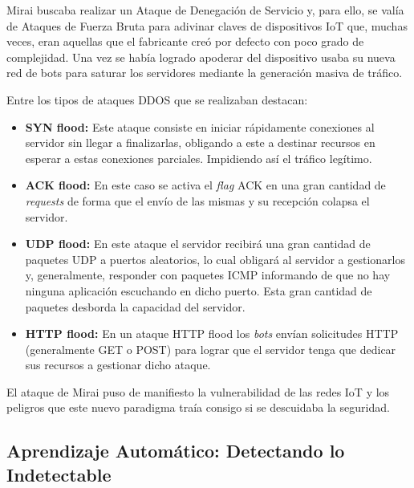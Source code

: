  
 Mirai buscaba realizar un Ataque de Denegación de Servicio y, para ello, se valía de Ataques de Fuerza Bruta para adivinar claves de dispositivos IoT que, muchas veces, eran aquellas que el fabricante creó por defecto con poco grado de complejidad. Una vez se había logrado apoderar del dispositivo usaba su nueva red de bots para saturar los servidores mediante la generación masiva de tráfico. 
 
 
 Entre los tipos de ataques DDOS que se realizaban destacan:
 \begin{itemize}
 	\item \textbf{SYN flood:} Este ataque consiste en iniciar rápidamente conexiones al servidor sin llegar a finalizarlas, obligando a este a destinar recursos en esperar a estas conexiones parciales. Impidiendo así el tráfico legítimo.
 	\item \textbf{ACK flood:} En este caso se activa el \textit{flag} ACK en una gran cantidad de \textit{requests} de forma que el envío de las mismas y su recepción colapsa el servidor.
 	\item \textbf{UDP flood:} En este ataque el servidor recibirá una gran cantidad de paquetes UDP a puertos aleatorios, lo cual obligará al servidor a gestionarlos y, generalmente, responder con paquetes ICMP informando de que no hay ninguna aplicación escuchando en dicho puerto. Esta gran cantidad de paquetes desborda la capacidad del servidor.
 	\item \textbf{HTTP flood:} En un ataque HTTP flood los \textit{bots} envían solicitudes HTTP (generalmente GET o POST) para lograr que el servidor tenga que dedicar sus recursos a gestionar dicho ataque.
\end{itemize}
El ataque de Mirai puso de manifiesto la vulnerabilidad de las redes IoT y los peligros que este nuevo paradigma traía consigo si se descuidaba la seguridad.
\subsection{Aprendizaje Automático: Detectando lo Indetectable}
